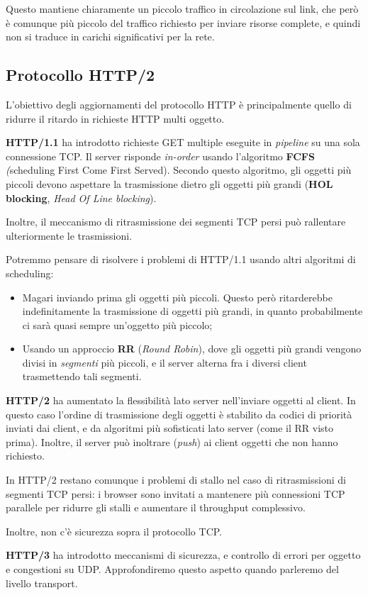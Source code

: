 \documentclass[a4paper,11pt]{article}
\begin{document}
Questo mantiene chiaramente un piccolo traffico in circolazione sul link, che però è comunque più piccolo del traffico richiesto per inviare risorse complete, e quindi non si traduce in carichi significativi per la rete.

\subsection{Protocollo HTTP/2}
L'obiettivo degli aggiornamenti del protocollo HTTP è principalmente quello di ridurre il ritardo in richieste HTTP multi oggetto.

\textbf{HTTP/1.1} ha introdotto richieste GET multiple eseguite in \textit{pipeline} su una sola connessione TCP.
Il server risponde \textit{in-order} usando l'algoritmo \textbf{FCFS} \textit(scheduling First Come First Served). 
Secondo questo algoritmo, gli oggetti più piccoli devono aspettare la trasmissione dietro gli oggetti più grandi (\textbf{HOL blocking}, \textit{Head Of Line blocking}).

Inoltre, il meccanismo di ritrasmissione dei segmenti TCP persi può rallentare ulteriormente le trasmissioni.

Potremmo pensare di risolvere i problemi di HTTP/1.1 usando altri algoritmi di scheduling:
\begin{itemize}
	\item Magari inviando prima gli oggetti più piccoli. Questo però ritarderebbe indefinitamente la trasmissione di oggetti più grandi, in quanto probabilmente ci sarà quasi sempre un'oggetto più piccolo;
	\item Usando un approccio \textbf{RR} (\textit{Round Robin}), dove gli oggetti più grandi vengono divisi in \textit{segmenti} più piccoli, e il server alterna fra i diversi client trasmettendo tali segmenti.
\end{itemize}

\textbf{HTTP/2} ha aumentato la flessibilità lato server nell'inviare oggetti al client.
In questo caso l'ordine di trasmissione degli oggetti è stabilito da codici di priorità inviati dai client, e da algoritmi più sofisticati lato server (come il RR visto prima).
Inoltre, il server può inoltrare (\textit{push}) ai client oggetti che non hanno richiesto.

In HTTP/2 restano comunque i problemi di stallo nel caso di ritrasmissioni di segmenti TCP persi: i browser sono invitati a mantenere più connessioni TCP parallele per ridurre gli stalli e aumentare il throughput complessivo.

Inoltre, non c'è sicurezza sopra il protocollo TCP.

\textbf{HTTP/3} ha introdotto meccanismi di sicurezza, e controllo di errori per oggetto e congestioni su UDP. Approfondiremo questo aspetto quando parleremo del livello transport.
\end{document}
